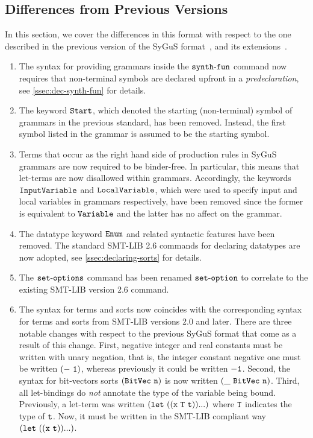 \documentclass[english,a4paper,10pt]{article}
\begin{document}
\subsection{Differences from Previous Versions}

In this section, we cover the differences
in this format with respect to the one described in the previous
version of the SyGuS format~\cite{sygusFormat},
and its extensions~\cite{sygusSyntax2015,sygusSyntax2016}.

\begin{enumerate}

\item The syntax for providing grammars inside the ${\tt synth\mbox{-}fun}$ command
now requires that non-terminal symbols are declared upfront
in a \emph{predeclaration}, see \cref{ssec:dec-synth-fun}
for details.

\item 
The keyword ${\tt Start}$, which 
denoted the starting (non-terminal) symbol of
grammars in the previous standard, has been removed.
Instead, the first symbol listed in the grammar is assumed
to be the starting symbol.

\item 
Terms that occur as the right hand side of production rules in
SyGuS grammars are now required to be binder-free.
In particular, this means that let-terms are now disallowed within grammars.
Accordingly,
the keywords ${\tt InputVariable}$ and ${\tt LocalVariable}$,
which were used to specify input and local variables in grammars
respectively, have been removed since the former is equivalent to ${\tt Variable}$
and the latter has no affect on the grammar.

\item The datatype keyword ${\tt Enum}$
and related syntactic features have been removed.
The standard SMT-LIB 2.6 commands
for declaring datatypes are now adopted,
see \cref{ssec:declaring-sorts} for details.

\item The ${\tt set\mbox{-}options}$ command has been renamed ${\tt set\mbox{-}option}$ to 
correlate to the existing SMT-LIB version 2.6 command.

\item 
The syntax for terms and sorts
now coincides with the corresponding syntax for terms and sorts 
from SMT-LIB versions 2.0 and later.
There are three notable changes
with respect to the previous SyGuS format that come as a result of this change.
First,
negative integer and real constants must be written with
unary negation, that is, the integer constant negative one
must be written ${\tt (-\ 1)}$, whereas previously it could
be written ${\tt -1}$.
Second,
the syntax for bit-vectors sorts ${\tt (BitVec\ n)}$
is now written  ${\tt (\_\ BitVec\ n)}$.
Third,
all let-bindings do \emph{not} annotate the type of the variable being bound.
Previously, a let-term was written ${\tt (let\ ((x\ T\ t)) ...)}$
where ${\tt T}$ indicates the type of ${\tt t}$.
Now, it must be written in the SMT-LIB compliant
way ${\tt (let\ ((x\ t)) ...)}$.


\end{enumerate}
\end{document}
